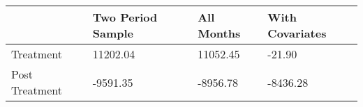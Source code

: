 \begin{tabular}{llll}
\toprule
 & Two Period Sample & All Months & With Covariates \\
\midrule
Treatment & 11202.04 & 11052.45 & -21.90 \\
Post Treatment & -9591.35 & -8956.78 & -8436.28 \\
\bottomrule
\end{tabular}
